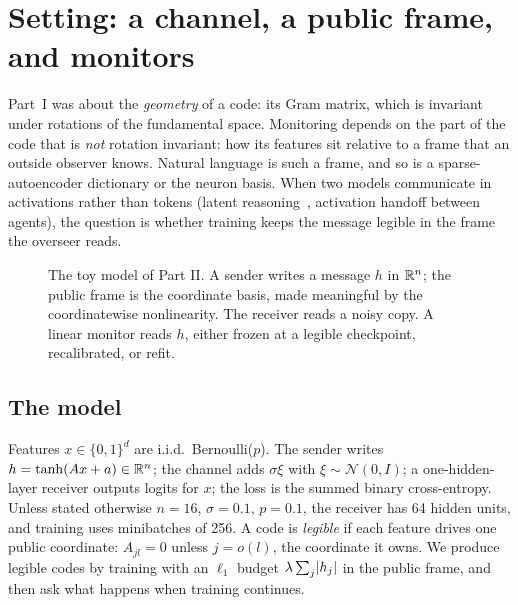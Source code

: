 \section{Setting: a channel, a public frame, and monitors}\label{sec:setting}

Part~I was about the \emph{geometry} of a code: its Gram matrix, which is invariant under rotations of the
fundamental space. Monitoring depends on the part of the code that is \emph{not} rotation invariant: how its
features sit relative to a frame that an outside observer knows. Natural language is such a frame, and so is a
sparse-autoencoder dictionary or the neuron basis. When two models communicate in activations rather than tokens
(latent reasoning~\cite{Coconut}, activation handoff between agents), the question is whether training keeps the
message legible in the frame the overseer reads.

\begin{figure}[h]
\centering\ChannelPicture
\caption{The toy model of Part II. A sender writes a message $h$ in $\mathbb R^n$; the public frame is the coordinate
basis, made meaningful by the coordinatewise nonlinearity. The receiver reads a noisy copy. A linear monitor reads
$h$, either frozen at a legible checkpoint, recalibrated, or refit.}
\label{fig:channel}
\end{figure}

\subsection{The model}
Features $x\in\{0,1\}^d$ are i.i.d.\ Bernoulli($p$). The sender writes $h=\tanh(Ax+a)\in\mathbb R^n$; the channel adds
$\sigma\xi$ with $\xi\sim\mathcal N(0,I)$; a one-hidden-layer receiver outputs logits for $x$; the loss is the
summed binary cross-entropy. Unless stated otherwise $n=16$, $\sigma=0.1$, $p=0.1$, the receiver has 64 hidden
units, and training uses minibatches of 256. A code is \emph{legible} if each feature drives one public coordinate:
$A_{jl}=0$ unless $j=o(l)$, the coordinate it owns. We produce legible codes by training with an $\ell_1$ budget
$\lambda\sum_j\lvert h_j\rvert$ in the public frame, and then ask what happens when training continues.


